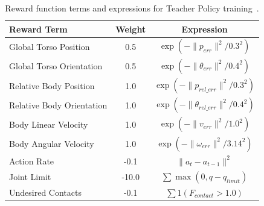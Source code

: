 \begin{table}[t]
\centering
\caption{Reward function terms and expressions for Teacher Policy training~\cite{liao2025beyondmimic}.}
\label{tab:reward_params_teacher}
\begin{tabular}{@{}lcc@{}}
\toprule
\textbf{Reward Term} & \textbf{Weight} & \textbf{Expression} \\ \midrule
Global Torso Position & 0.5 & $\exp(-\|p_{err}\|^2 / 0.3^2)$ \\
Global Torso Orientation & 0.5 & $\exp(-\|\theta_{err}\|^2 / 0.4^2)$ \\
Relative Body Position & 1.0 & $\exp(-\|p_{rel\_err}\|^2 / 0.3^2)$ \\
Relative Body Orientation & 1.0 & $\exp(-\|\theta_{rel\_err}\|^2 / 0.4^2)$ \\
Body Linear Velocity & 1.0 & $\exp(-\|v_{err}\|^2 / 1.0^2)$ \\
Body Angular Velocity & 1.0 & $\exp(-\|\omega_{err}\|^2 / 3.14^2)$ \\
Action Rate & -0.1 & $\|a_{t} - a_{t-1}\|^2$ \\
Joint Limit & -10.0 & $\sum \max(0, q - q_{limit})$ \\
Undesired Contacts & -0.1 & $\sum 1(F_{contact} > 1.0)$ \\ \bottomrule
\end{tabular}
\end{table}
